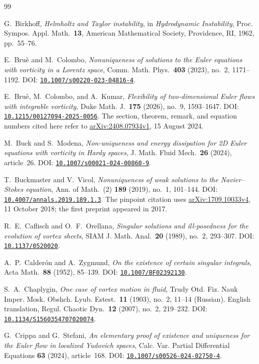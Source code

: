 \documentclass[11pt,a4paper,reqno]{amsart}
\theoremstyle{plain}
\theoremstyle{definition}
\theoremstyle{remark}
\numberwithin{equation}{section}
\newcommand{\doi}[1]{\href{https://doi.org/#1}{\nolinkurl{#1}}}
\begin{document}
\begin{thebibliography}{99}

G.~Birkhoff,
\emph{Helmholtz and Taylor instability},
in \emph{Hydrodynamic Instability}, Proc. Sympos. Appl. Math.\ \textbf{13},
American Mathematical Society, Providence, RI, 1962, pp.~55--76.

E.~Bru\`e and M.~Colombo,
\emph{Nonuniqueness of solutions to the Euler equations with vorticity in a Lorentz space},
Comm. Math. Phys.\ \textbf{403} (2023), no.~2, 1171--1192.
DOI: \doi{10.1007/s00220-023-04816-4}.

E.~Bru\`e, M.~Colombo, and A.~Kumar,
\emph{Flexibility of two-dimensional Euler flows with integrable vorticity},
Duke Math. J.\ \textbf{175} (2026), no.~9, 1593--1647.
DOI: \doi{10.1215/00127094-2025-0056}.
The section, theorem, remark, and equation numbers cited here refer to
\href{https://arxiv.org/abs/2408.07934v1}{arXiv:2408.07934v1}, 15 August 2024.

M.~Buck and S.~Modena,
\emph{Non-uniqueness and energy dissipation for 2D Euler equations with vorticity in Hardy spaces},
J. Math. Fluid Mech.\ \textbf{26} (2024), article~26.
DOI: \doi{10.1007/s00021-024-00860-9}.

T.~Buckmaster and V.~Vicol,
\emph{Nonuniqueness of weak solutions to the Navier--Stokes equation},
Ann. of Math.\ (2) \textbf{189} (2019), no.~1, 101--144.
DOI: \doi{10.4007/annals.2019.189.1.3}.
The pinpoint citation uses \href{https://arxiv.org/abs/1709.10033v4}{arXiv:1709.10033v4},
11 October 2018; the first preprint appeared in 2017.

R.~E.~Caflisch and O.~F.~Orellana,
\emph{Singular solutions and ill-posedness for the evolution of vortex sheets},
SIAM J. Math. Anal.\ \textbf{20} (1989), no.~2, 293--307.
DOI: \doi{10.1137/0520020}.

A.~P.~Calder\'on and A.~Zygmund,
\emph{On the existence of certain singular integrals},
Acta Math.\ \textbf{88} (1952), 85--139.
DOI: \doi{10.1007/BF02392130}.

S.~A.~Chaplygin,
\emph{One case of vortex motion in fluid},
Trudy Otd. Fiz. Nauk Imper. Mosk. Obshch. Lyub. Estest.\
\textbf{11} (1903), no.~2, 11--14 (Russian).
English translation, Regul. Chaotic Dyn.\ \textbf{12} (2007), no.~2, 219--232.
DOI: \doi{10.1134/S1560354707020074}.

G.~Crippa and G.~Stefani,
\emph{An elementary proof of existence and uniqueness for the Euler flow in localized Yudovich spaces},
Calc. Var. Partial Differential Equations \textbf{63} (2024), article~168.
DOI: \doi{10.1007/s00526-024-02750-4}.


\end{thebibliography}
\end{document}
